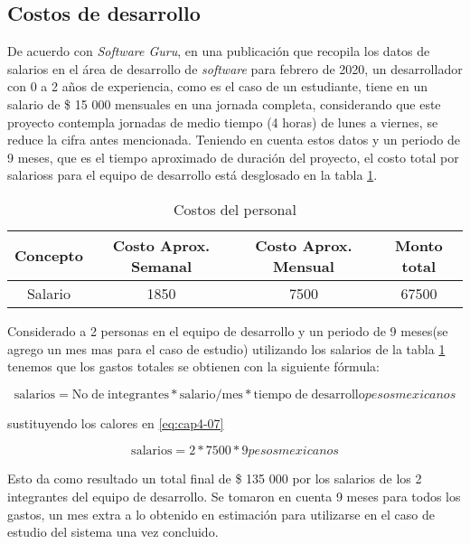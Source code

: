 \subsection{Costos de desarrollo}

De acuerdo con \textit{Software Guru}\cite{pedro_galvan_estudio_2020}, en una publicación que recopila los datos de salarios en el área de desarrollo de \textit{software} para febrero de 2020, un desarrollador con 0 a 2 años de experiencia, como es el caso de un estudiante, tiene en un salario de \$ 15 000 mensuales en una jornada completa, considerando que este proyecto contempla jornadas de medio tiempo (4 horas) de lunes a viernes, se reduce la cifra antes mencionada. Teniendo en cuenta estos datos y un periodo de 9 meses, que es el tiempo aproximado de duración del proyecto, el costo total por salarioss para el equipo de desarrollo está desglosado en la tabla \ref{tab:devs_salary}.

\begin{table}[H]
    \centering
    \begin{tabular}{|c|c|c|c|}
    \hline
        Concepto & Costo Aprox. Semanal & Costo Aprox. Mensual & Monto total \\ \hline
        Salario & 1850 & 7500 & 67500 \\ \hline
    \end{tabular}
    \caption{Costos del personal}
    \label{tab:devs_salary}
\end{table}


Considerado a 2 personas en el equipo de desarrollo y un periodo de 9 meses(se agrego un mes mas para el caso de estudio) utilizando los salarios de la tabla \ref{tab:devs_salary} tenemos que los gastos totales se obtienen con la siguiente fórmula:

\begin{equation} \label{eq:cap4-07}
	\mathrm{salarios} =  \mathrm{No\; de\; integrantes} * \mathrm{salario/mes} * \mathrm{tiempo\; de\; desarrollo}  {pesos mexicanos}
\end{equation}

sustituyendo los calores en \eqref{eq:cap4-07}

\begin{equation} \label{eq:cap4-08}
	\mathrm{salarios} =  2 * 7500 * 9  {pesos mexicanos}
\end{equation}


Esto da como resultado un total final de \$ 135 000 por los salarios de los 2 integrantes del equipo de desarrollo. Se tomaron en cuenta 9 meses para todos los gastos, un mes extra a lo obtenido en estimación para utilizarse en el caso de estudio del sistema una vez concluido.

